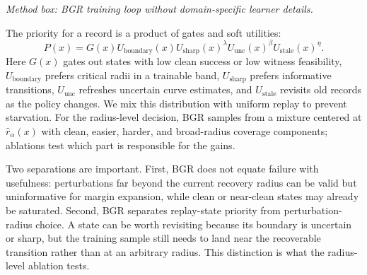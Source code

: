 \documentclass[letterpaper]{article}
\begin{document}
\begin{center}
\small
{}
\noindent\textit{Method box: BGR training loop without domain-specific learner details.}
\end{center}

The priority for a record is a product of gates and soft utilities:
\begin{equation}
P(x)=G(x)U_{\mathrm{boundary}}(x)U_{\mathrm{sharp}}(x)^\lambda
U_{\mathrm{unc}}(x)^\beta U_{\mathrm{stale}}(x)^\eta.
\end{equation}
Here $G(x)$ gates out states with low clean success or low witness feasibility, $U_{\mathrm{boundary}}$ prefers critical radii in a trainable band, $U_{\mathrm{sharp}}$ prefers informative transitions, $U_{\mathrm{unc}}$ refreshes uncertain curve estimates, and $U_{\mathrm{stale}}$ revisits old records as the policy changes. We mix this distribution with uniform replay to prevent starvation. For the radius-level decision, BGR samples from a mixture centered at $\hat r_\alpha(x)$ with clean, easier, harder, and broad-radius coverage components; ablations test which part is responsible for the gains.

Two separations are important. First, BGR does not equate failure with usefulness: perturbations far beyond the current recovery radius can be valid but uninformative for margin expansion, while clean or near-clean states may already be saturated. Second, BGR separates replay-state priority from perturbation-radius choice. A state can be worth revisiting because its boundary is uncertain or sharp, but the training sample still needs to land near the recoverable transition rather than at an arbitrary radius. This distinction is what the radius-level ablation tests.
\end{document}
